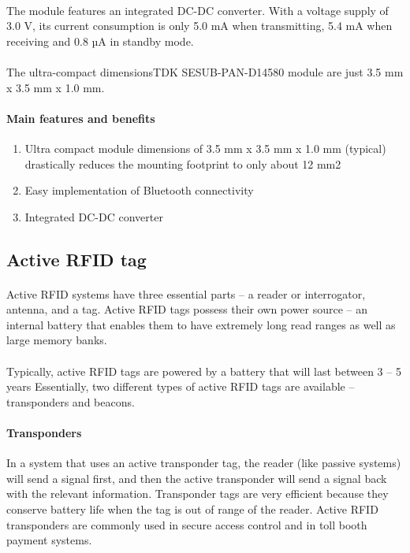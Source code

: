 \documentclass[12pt,a4paper]{article}
\begin{document}
\begin{appendices}
      \paragraph{}
      The module features an integrated DC-DC converter. With a voltage supply of 3.0 V, its current consumption is only 5.0 mA when transmitting, 5.4 mA when receiving and 0.8 µA in standby mode.
      \paragraph{}
      The ultra-compact dimensionsTDK SESUB-PAN-D14580 module are just 3.5 mm x 3.5 mm x 1.0 mm.
      \paragraph{Main features and benefits}  
      \begin{enumerate}
        \item Ultra compact module dimensions of 3.5 mm x 3.5 mm x 1.0 mm (typical) drastically reduces the mounting footprint to only about 12 mm2
        \item Easy implementation of Bluetooth connectivity
        \item Integrated DC-DC converter
      \end{enumerate}
    
    \subsection{Active RFID tag}
      \paragraph{}
        Active RFID systems have three essential parts – a reader or interrogator, antenna, and a tag. Active RFID tags possess their own power source – an internal battery that enables them to have extremely long read ranges as well as large memory banks.
      \paragraph{}
        Typically, active RFID tags are powered by a battery that will last between 3 – 5 years Essentially, two different types of active RFID tags are available – transponders and beacons.
      \paragraph{Transponders} 
        In a system that uses an active transponder tag, the reader (like passive systems) will send a signal first, and then the active transponder will send a signal back with the relevant information. Transponder tags are very efficient because they conserve battery life when the tag is out of range of the reader. Active RFID transponders are commonly used in secure access control and in toll booth payment systems.

\end{appendices}
\end{document}
